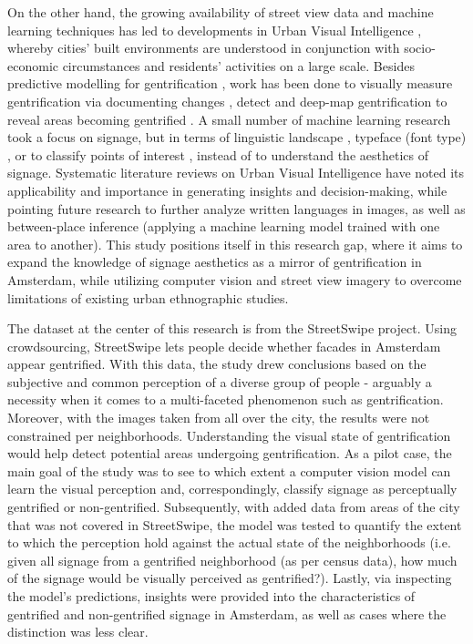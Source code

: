 On the other hand, the growing availability of street view data and machine learning techniques has led to developments in Urban Visual Intelligence \cite{zhanga_urban_2023}, whereby cities' built environments are understood in conjunction with socio-economic circumstances and residents' activities on a large scale. Besides predictive modelling for gentrification \cite{thackway_build_2021, reades_understanding_2019}, work has been done to visually measure gentrification via documenting changes \cite{ravuri_gsv_2022}, detect \cite{huang_detecting_2022} and deep-map gentrification to reveal areas becoming gentrified \cite{ilic_deepmap_2019}. A small number of machine learning research took a focus on signage, but in terms of linguistic landscape \cite{hong_linguistic_2020, thung_detecting_2022}, typeface (font type) \cite{ma_typef_2019}, or to classify points of interest \cite{noorian_detect_2020, bakaev_stsem_2019}, instead of to understand the aesthetics of signage. Systematic literature reviews on Urban Visual Intelligence \cite{biljecki_street_2021, zhanga_urban_2023} have noted its applicability and importance in generating insights and decision-making, while pointing future research to further analyze written languages in images, as well as between-place inference (applying a machine learning model trained with one area to another). This study positions itself in this research gap, where it aims to expand the knowledge of signage aesthetics as a mirror of gentrification in Amsterdam, while utilizing computer vision and street view imagery to overcome limitations of existing urban ethnographic studies.

The dataset at the center of this research is from the StreetSwipe project. Using crowdsourcing, StreetSwipe \cite{streetswipe} lets people decide whether facades in Amsterdam appear gentrified. With this data, the study drew conclusions based on the subjective and common perception of a diverse group of people - arguably a necessity when it comes to a multi-faceted phenomenon such as gentrification. Moreover, with the images taken from all over the city, the results were not constrained per neighborhoods. Understanding the visual state of gentrification would help detect potential areas undergoing gentrification. As a pilot case, the main goal of the study was to see to which extent a computer vision model can learn the visual perception and, correspondingly, classify signage as perceptually gentrified or non-gentrified. Subsequently, with added data from areas of the city that was not covered in StreetSwipe, the model was tested to quantify the extent to which the perception hold against the actual state of the neighborhoods (i.e. given all signage from a gentrified neighborhood (as per census data), how much of the signage would be visually perceived as gentrified?). Lastly, via inspecting the model's predictions, insights were provided into the characteristics of gentrified and non-gentrified signage in Amsterdam, as well as cases where the distinction was less clear.

